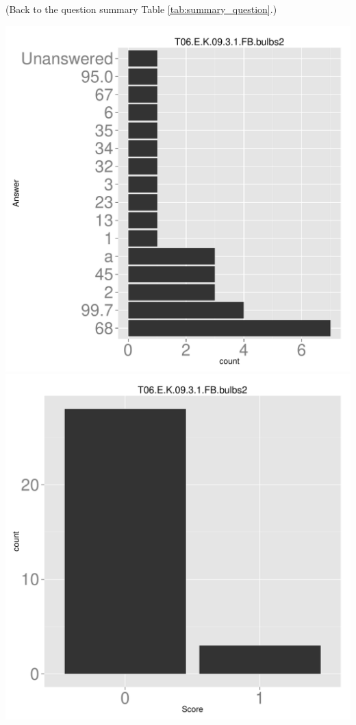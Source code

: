 \documentclass[12pt,nohyper]{tufte-handout}\usepackage[]{graphicx}\usepackage[]{color}
\begin{document}
 (Back to the question summary Table \ref{tab:summary_question}.)

\begin{center} \includegraphics[width=.45\linewidth]{Topic06_34_answer} \includegraphics[width=.45\linewidth]{Topic06_34_score} \end{center} 
\end{document}
